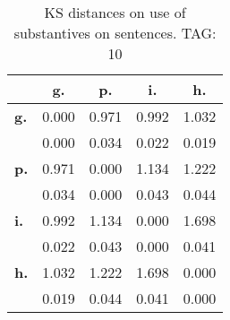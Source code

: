 \begin{table}[h!]
\begin{center}
\begin{tabular}{| l || c | c | c | c |}\hline
 & {\bf g.} & {\bf p.} & {\bf i.} & {\bf h.} \\\hline\hline
{\bf g.} & 0.000 & 0.971 & 0.992 & 1.032 \\
{\bf } & 0.000 & 0.034 & 0.022 & 0.019 \\\hline
{\bf p.} & 0.971 & 0.000 & 1.134 & 1.222 \\
{\bf } & 0.034 & 0.000 & 0.043 & 0.044 \\\hline
{\bf i.} & 0.992 & 1.134 & 0.000 & 1.698 \\
{\bf } & 0.022 & 0.043 & 0.000 & 0.041 \\\hline
{\bf h.} & 1.032 & 1.222 & 1.698 & 0.000 \\
{\bf } & 0.019 & 0.044 & 0.041 & 0.000 \\\hline
\end{tabular}
\caption{KS distances on use of substantives on sentences. TAG: 10}
\end{center}
\end{table}